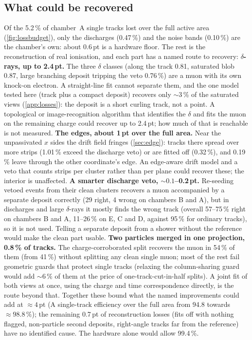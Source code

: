 \subsection{What could be recovered}\label{sec:improve}
Of the 5.2\,\% of chamber~A single tracks lost over the full active area (\cref{fig:lossbudget}), only the discharges
(0.47\,\%) and the noise bands (0.10\,\%) are the chamber's own: about 0.6\,pt is a hardware floor. The rest is the
reconstruction of real ionisation, and each part has a named route to recovery:
\textbf{$\delta$-rays, up to 2.4\,pt.} The three $\delta$ classes (along the track 0.81, saturated blob 0.87, large
branching deposit tripping the veto 0.76\,\%) are a muon with its own knock-on electron. A straight-line fit cannot
separate them, and the one model tested here (track plus a compact deposit) recovers only ${\sim}3$\,\% of the saturated
views (\cref{app:losses}): the deposit is a short curling track, not a point. A topological or image-recognition
algorithm that identifies the $\delta$ and fits the muon on the remaining charge could recover up to 2.4\,pt; how much
of that is reachable is not measured.
\textbf{The edges, about 1\,pt over the full area.} Near the unpassivated $x$ sides the drift field fringes
(\cref{sec:edge}): tracks there spread over more strips (1.01\,\% exceed the discharge veto) or are fitted off (0.32\,\%), and
0.19\,\% leave through the other coordinate's edge. An edge-aware drift model and a veto that counts strips per cluster
rather than per plane could recover these; the interior is unaffected.
\textbf{A smarter discharge veto, ${\sim}0.1$--0.2\,pt.} Re-seeding vetoed events from their clean clusters recovers a
muon accompanied by a separate deposit correctly (29 right, 4 wrong on chambers B and A), but in discharges and large
$\delta$-rays it mostly finds the wrong track (overall 57--75\,\% right on chambers B and A, 11--26\,\% on E, C and D, against
95\,\% for ordinary tracks), so it is not used. Telling a separate deposit from a shower without the reference would
make the clean part usable.
\textbf{Two particles merged in one projection, 0.8\,\% of tracks.} The charge-corroborated split recovers the muon
in 54\,\% of them (from 41\,\%) without splitting any clean single muon; most of the rest fail geometric guards that
protect single tracks (relaxing the column-sharing guard would add ${\sim}6$\,\% of them at the price of
one-track-cut-in-half splits). A joint fit of both views at once, using the charge and time correspondence directly,
is the route beyond that.
Together these bound what the named improvements could add at ${\approx}4$\,pt (A single-track efficiency over the
full area from 94.8 towards ${\approx}98.8\,\%$); the remaining 0.7\,pt of reconstruction losses (fits off with nothing
flagged, non-particle second deposits, right-angle tracks far from the reference) have no identified cause. The hardware alone
would allow 99.4\,\%.

